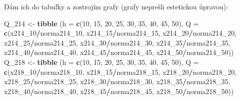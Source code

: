 \documentclass[]{article}
\newenvironment{Shaded}{\begin{snugshade}}{\end{snugshade}}
\newcommand{\DataTypeTok}[1]{\textcolor[rgb]{0.13,0.29,0.53}{#1}}
\newcommand{\DecValTok}[1]{\textcolor[rgb]{0.00,0.00,0.81}{#1}}
\newcommand{\KeywordTok}[1]{\textcolor[rgb]{0.13,0.29,0.53}{\textbf{#1}}}
\newcommand{\NormalTok}[1]{#1}
\newcommand{\OperatorTok}[1]{\textcolor[rgb]{0.81,0.36,0.00}{\textbf{#1}}}
\newcommand{\StringTok}[1]{\textcolor[rgb]{0.31,0.60,0.02}{#1}}
\begin{document}
Dám ich do tabuľky a zostrojím grafy (grafy neprešli estetickou
úpravou):

\begin{Shaded}
\begin{Highlighting}[]
\NormalTok{Q_}\DecValTok{214}\NormalTok{ <-}\StringTok{ }\KeywordTok{tibble}\NormalTok{ (}\DataTypeTok{h =} \KeywordTok{c}\NormalTok{(}\DecValTok{10}\NormalTok{, }\DecValTok{15}\NormalTok{, }\DecValTok{20}\NormalTok{, }\DecValTok{25}\NormalTok{, }\DecValTok{30}\NormalTok{, }\DecValTok{35}\NormalTok{, }\DecValTok{40}\NormalTok{, }\DecValTok{45}\NormalTok{, }\DecValTok{50}\NormalTok{), }\DataTypeTok{Q =} \KeywordTok{c}\NormalTok{(x214_}\DecValTok{10}\OperatorTok{/}\NormalTok{norma214_}\DecValTok{10}\NormalTok{, x214_}\DecValTok{15}\OperatorTok{/}\NormalTok{norma214_}\DecValTok{15}\NormalTok{, x214_}\DecValTok{20}\OperatorTok{/}\NormalTok{norma214_}\DecValTok{20}\NormalTok{, x214_}\DecValTok{25}\OperatorTok{/}\NormalTok{norma214_}\DecValTok{25}\NormalTok{, x214_}\DecValTok{30}\OperatorTok{/}\NormalTok{norma214_}\DecValTok{30}\NormalTok{, x214_}\DecValTok{35}\OperatorTok{/}\NormalTok{norma214_}\DecValTok{35}\NormalTok{, x214_}\DecValTok{40}\OperatorTok{/}\NormalTok{norma214_}\DecValTok{40}\NormalTok{, x214_}\DecValTok{45}\OperatorTok{/}\NormalTok{norma214_}\DecValTok{45}\NormalTok{, x214_}\DecValTok{50}\OperatorTok{/}\NormalTok{norma214_}\DecValTok{50}\NormalTok{))}
\NormalTok{Q_}\DecValTok{218}\NormalTok{ <-}\StringTok{ }\KeywordTok{tibble}\NormalTok{ (}\DataTypeTok{h =} \KeywordTok{c}\NormalTok{(}\DecValTok{10}\NormalTok{, }\DecValTok{15}\NormalTok{, }\DecValTok{20}\NormalTok{, }\DecValTok{25}\NormalTok{, }\DecValTok{30}\NormalTok{, }\DecValTok{35}\NormalTok{, }\DecValTok{40}\NormalTok{, }\DecValTok{45}\NormalTok{, }\DecValTok{50}\NormalTok{), }\DataTypeTok{Q =} \KeywordTok{c}\NormalTok{(x218_}\DecValTok{10}\OperatorTok{/}\NormalTok{norma218_}\DecValTok{10}\NormalTok{, x218_}\DecValTok{15}\OperatorTok{/}\NormalTok{norma218_}\DecValTok{15}\NormalTok{, x218_}\DecValTok{20}\OperatorTok{/}\NormalTok{norma218_}\DecValTok{20}\NormalTok{, x218_}\DecValTok{25}\OperatorTok{/}\NormalTok{norma218_}\DecValTok{25}\NormalTok{, x218_}\DecValTok{30}\OperatorTok{/}\NormalTok{norma218_}\DecValTok{30}\NormalTok{, x218_}\DecValTok{35}\OperatorTok{/}\NormalTok{norma218_}\DecValTok{35}\NormalTok{, x218_}\DecValTok{40}\OperatorTok{/}\NormalTok{norma218_}\DecValTok{40}\NormalTok{, x218_}\DecValTok{45}\OperatorTok{/}\NormalTok{norma218_}\DecValTok{45}\NormalTok{, x218_}\DecValTok{50}\OperatorTok{/}\NormalTok{norma218_}\DecValTok{50}\NormalTok{))}
\end{Highlighting}
\end{Shaded}
\end{document}
